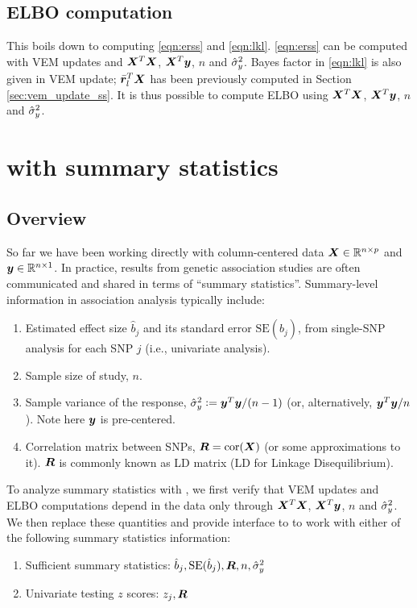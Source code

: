 \subsection{ELBO computation} \label{sec:elbo_ss}
This boils down to computing \eqref{eqn:erss} and \eqref{eqn:lkl}. \eqref{eqn:erss} can be computed with VEM updates and $\bm X^T\bm X$, $\bm X^T\bm y$, $n$ and $\hat{\sigma}_y^2$. Bayes factor in \eqref{eqn:lkl} is also given in VEM update; $\bar{\bm r}_l^T\bm X$ has been previously computed in Section \ref{sec:vem_update_ss}. It is thus possible to compute ELBO using $\bm X^T\bm X$, $\bm X^T\bm y$, $n$ and $\hat{\sigma}_y^2$.

\section{\susie with summary statistics}

\subsection{Overview}
So far we have been working directly with column-centered data $\bm X\in \mathbb{R}^{n\times p}$ and $\bm y\in\mathbb{R}^{n\times 1}$. In practice, results from genetic association studies are often communicated and shared in terms of ``summary statistics''. Summary-level information in association analysis typically include:
\begin{enumerate}
\item Estimated effect size $\hat{b}_j$ and its standard error $\text{SE}(\hat{b}_j)$, from single-SNP analysis for each SNP $j$ (i.e., univariate analysis). 
\item Sample size of study, $n$.
\item Sample variance of the response, $\hat{\sigma}_y^2 := \bm y^T\bm y/(n-1)$ (or, alternatively, $\bm y^T\bm y/n$). Note here $\bm y$ is pre-centered. 
\item Correlation matrix between SNPs, $\bm R=\text{cor}(\bm X)$ (or some approximations to it). $\bm R$ is commonly known as LD matrix (LD for Linkage Disequilibrium).
\end{enumerate}
To analyze summary statistics with \susie, we first verify that \susie VEM updates and ELBO computations depend in the data only through $\bm X^T\bm X$, $\bm X^T\bm y$, $n$ and $\hat{\sigma}_y^2$. We then replace these quantities and provide interface to \susie to work with either of the following summary statistics information:
\begin{enumerate}
    \item Sufficient summary statistics: $\hat{b}_j, \text{SE}(\hat{b}_j), \bm R, n, \hat{\sigma}_y^2$
    \item Univariate testing $z$ scores: $z_j, \bm R$
\end{enumerate}

